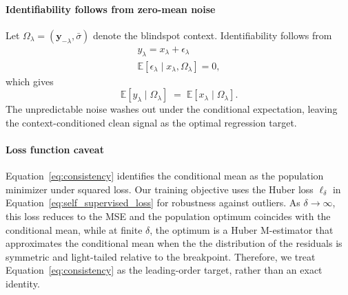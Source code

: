 \documentclass[twocolumn]{aastex7}
\newcommand{\m}[1]{\boldsymbol{#1}}
\begin{document}
\paragraph{Identifiability follows from zero-mean noise} Let $\Omega_{\lambda} = (\m{y}_{-\lambda},\bar{\sigma})$ denote the blindspot context. Identifiability follows from
\begin{align}
    y_{\lambda} = x_{\lambda} + \epsilon_{\lambda} \\[1em]
    \mathbb{E}\!\left[\epsilon_{\lambda} \mid x_{\lambda},\Omega_{\lambda}\right] = 0,
    \label{eq:consistency_setup}
\end{align}
which gives
\begin{equation}
    \mathbb{E}\!\left[y_{\lambda}\mid \Omega_{\lambda}\right]
    \;=\;
    \mathbb{E}\!\left[x_{\lambda}\mid \Omega_{\lambda}\right].
    \label{eq:consistency}
\end{equation}
The unpredictable noise washes out under the conditional expectation, leaving the context-conditioned clean signal as the optimal regression target.

\paragraph{Loss function caveat}
Equation~\ref{eq:consistency} identifies the conditional mean as the population minimizer under squared loss. Our training objective uses the Huber loss $\ell_{\delta}$ in Equation~\ref{eq:self_supervised_loss} for robustness against outliers. As $\delta\to\infty$, this loss reduces to the MSE and the population optimum coincides with the conditional mean, while at finite $\delta$, the optimum is a Huber M-estimator that approximates the conditional mean when the the distribution of the residuals is symmetric and light-tailed relative to the breakpoint. Therefore, we treat Equation~\ref{eq:consistency} as the leading-order target, rather than an exact identity.
\end{document}
